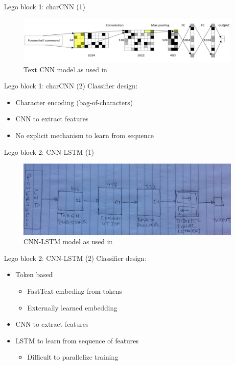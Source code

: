 \documentclass[10pt]{beamer}
\begin{document}
\begin{frame}{Lego block 1: charCNN (1)}
	\begin{figure}
		\includegraphics[scale=0.28]{charcnn}
		\caption{Text CNN model as used in \cite{powershell2018}}
	\end{figure}
\end{frame}

\begin{frame}{Lego block 1: charCNN (2)}
	Classifier design:
	\begin{itemize}
		\item Character encoding (bag-of-characters)
		\item CNN to extract features
		\item No explicit mechanism to learn from sequence
	\end{itemize}
\end{frame}

\begin{frame}{Lego block 2: CNN-LSTM (1)}
	\begin{figure}
		\includegraphics[scale=0.50]{cnn-lstm}
		\caption{CNN-LSTM model as used in \cite{amsi2019}}
	\end{figure}
\end{frame}

\begin{frame}{Lego block 2: CNN-LSTM (2)}
	Classifier design:
	\begin{itemize}
		\item Token based
		\begin{itemize}
			\item FastText embeding from tokens
			\item Externally learned embedding
		\end{itemize}
		\item CNN to extract features
		\item LSTM to learn from sequence of features
		\begin{itemize}
			\item Difficult to parallelize training
		\end{itemize}
	\end{itemize}
\end{frame}
\end{document}
